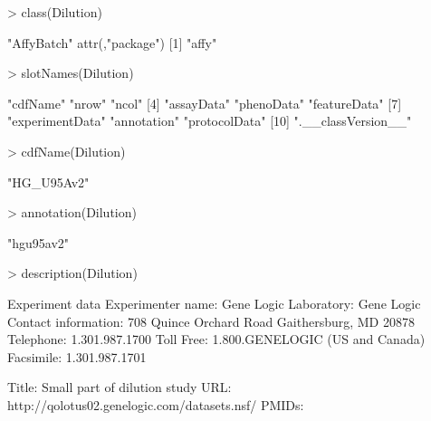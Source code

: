 \documentclass[12pt]{article}
\begin{document}
\begin{Schunk}
\begin{Sinput}
> class(Dilution)
\end{Sinput}
\begin{Soutput}
[1] "AffyBatch"
attr(,"package")
[1] "affy"
\end{Soutput}
\begin{Sinput}
> slotNames(Dilution)
\end{Sinput}
\begin{Soutput}
 [1] "cdfName"           "nrow"              "ncol"             
 [4] "assayData"         "phenoData"         "featureData"      
 [7] "experimentData"    "annotation"        "protocolData"     
[10] ".__classVersion__"
\end{Soutput}
\begin{Sinput}
> cdfName(Dilution)
\end{Sinput}
\begin{Soutput}
[1] "HG_U95Av2"
\end{Soutput}
\begin{Sinput}
> annotation(Dilution)
\end{Sinput}
\begin{Soutput}
[1] "hgu95av2"
\end{Soutput}
\begin{Sinput}
> description(Dilution)
\end{Sinput}
\begin{Soutput}
Experiment data
  Experimenter name: Gene Logic 
  Laboratory: Gene Logic 
  Contact information: 708 Quince Orchard Road
Gaithersburg, MD 20878
Telephone: 1.301.987.1700
Toll Free: 1.800.GENELOGIC (US and Canada)
Facsimile: 1.301.987.1701
 
  Title: Small part of dilution study 
  URL: http://qolotus02.genelogic.com/datasets.nsf/ 
  PMIDs:  


\end{Soutput}
\end{Schunk}
\end{document}
